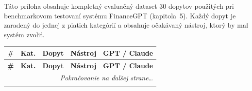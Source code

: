 
Táto príloha obsahuje kompletný evaluačný dataset 30 dopytov použitých pri benchmarkovom
testovaní systému FinanceGPT (kapitola~5). Každý dopyt je zaradený do jednej z
piatich kategórií a obsahuje očakávaný nástroj, ktorý by mal systém zvoliť.

\begin{small}
	\begin{longtable}
		{@{}clp{5.5cm}lc@{}}
		\toprule \textbf{\#} & \textbf{Kat.} & \textbf{Dopyt} & \textbf{Nástroj} & \textbf{GPT
		/ Claude} \\ \midrule \endfirsthead

		\toprule \textbf{\#} & \textbf{Kat.} & \textbf{Dopyt} & \textbf{Nástroj} & \textbf{GPT
		/ Claude} \\ \midrule \endhead

		\midrule \multicolumn{5}{r}{\footnotesize\textit{Pokračovanie na ďalšej
		strane\ldots}} \\ \endfoot

		\bottomrule \endlastfoot


\end{longtable}
\end{small}
